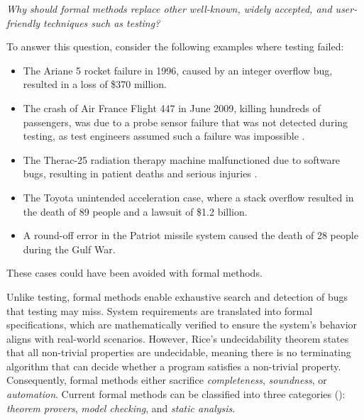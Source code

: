 \begin{center}\em
  Why should formal methods replace other well-known, widely accepted, and user-friendly techniques such as testing?
\end{center}

To answer this question, consider the following examples where testing failed:

\begin{itemize}
\item The Ariane 5 rocket failure in 1996, caused by an integer overflow bug, resulted in a loss of \$370 million.
\item The crash of Air France Flight 447 in June 2009, killing hundreds of passengers, was due to a probe sensor failure that was not detected during testing, as test engineers assumed such a failure was impossible .
\item The Therac-25 radiation therapy machine malfunctioned due to software bugs, resulting in patient deaths and serious injuries .
\item The Toyota unintended acceleration case, where a stack overflow resulted in the death of 89 people and a lawsuit of \$1.2 billion.
\item A round-off error in the Patriot missile system caused the death of 28 people during the Gulf War.
\end{itemize}

These cases could have been avoided with formal methods.

Unlike testing, formal methods enable exhaustive search and detection of bugs that testing may miss.
System requirements are translated into formal specifications, which are mathematically verified to ensure the system's behavior aligns with real-world scenarios.
However, Rice's undecidability theorem  states that all non-trivial properties are undecidable, meaning there is no terminating algorithm that can decide whether a program satisfies a non-trivial property.
Consequently, formal methods either sacrifice \emph{completeness}, \emph{soundness}, or \emph{automation}.
Current formal methods can be classified into three categories  (): \emph{theorem provers}, \emph{model checking}, and \emph{static analysis}.


